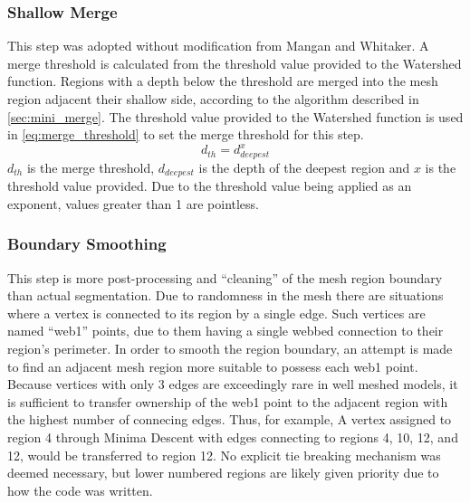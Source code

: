 \subsubsection{Shallow Merge}\label{sec:shallow_merge}
This step was adopted without modification from Mangan and Whitaker.
A merge threshold is calculated from the threshold value provided to the Watershed function.
Regions with a depth below the threshold are merged into the mesh region adjacent their shallow side, according to the algorithm described in \ref{sec:mini_merge}. %
The threshold value provided to the Watershed function is used in \ref{eq:merge_threshold} to set the merge threshold for this step.
\begin{equation}\label{eq:merge_threshold}
	d_{th} = d_{deepest}^{x}
\end{equation}
$d_{th}$ is the merge threshold, $d_{deepest}$ is the depth of the deepest region and $x$ is the threshold value provided.
Due to the threshold value being applied as an exponent, values greater than 1 are pointless.

\subsubsection{Boundary Smoothing}
This step is more post-processing and ``cleaning'' of the mesh region boundary than actual segmentation.
Due to randomness in the mesh there are situations where a vertex is connected to its region by a single edge.
Such vertices are named ``web1'' points, due to them having a single webbed connection to their region's perimeter.
In order to smooth the region boundary, an attempt is made to find an adjacent mesh region more suitable to possess each web1 point.
Because vertices with only 3 edges are exceedingly rare in well meshed models, it is sufficient to transfer ownership of the web1 point to the adjacent region with the highest number of connecing edges.
Thus, for example, A vertex assigned to region 4 through Minima Descent with edges connecting to regions 4, 10, 12, and 12, would be transferred to region 12.
No explicit tie breaking mechanism was deemed necessary, but lower numbered regions are likely given priority due to how the code was written.

